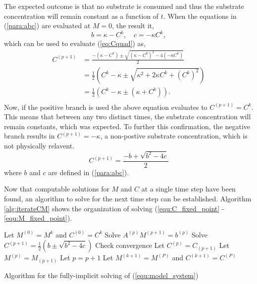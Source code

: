 The expected outcome is that no substrate is consumed and thus the substrate concentration will remain constant as a function of $t$. 
When the equations in (\ref{para:abc}) are evaluated at $M = 0$, the result it,
\begin{equation}
  b = \kappa - C^k, \quad c = -\kappa C^k,
\end{equation} 
which can be used to evaluate (\ref{eq:Cquad}) as,
\begin{equation} \begin{aligned}
  C^{(p+1)} &= \frac{- (\kappa - C^k) \pm \sqrt{(\kappa - C^k)^2 - 4 (-\kappa C^k)}}{2} \\
    &= \frac{1}{2} \left( C^k - \kappa \pm \sqrt{\kappa^2 + 2 \kappa C^k + \left(C^k \right) ^2}\right) \\
    &= \frac{1}{2} \left( C^k - \kappa \pm (\kappa+C^k) \right). \\
\end{aligned} \end{equation}
Now, if the positive branch is used the above equation evaluates to $C^{(p+1)} = C^k$. 
This means that between any two distinct times, the substrate concentration will remain constants, which was expected. 
To further this confirmation, the negative branch results in $C^{(p+1)} = -\kappa $, a non-postive substrate concentration, which is not physically relavent. 
\begin{equation}
  C^{(p+1)} = \frac{-b + \sqrt{b^2 - 4c}}{2}
\end{equation} 
where $b$ and $c$ are defined in (\ref{para:abc}).

Now that computable solutions for $M$ and $C$ at a single time step have been found, an algorithm to solve for the next time step can be established.
Algorithm \ref{alg:iterateCM} shows the organization of solving (\ref{equ:C_fixed_point} - \ref{equ:M_fixed_point}). 
\begin{algorithm}
  \Begin
  {
    Let $M^{(0)} = M^{k}$ and $C^{(0)} = C^{k}$\;
    {
        Solve $A^{(p)} M^{(p+1)} = b^{(p)}$\;
        Solve $C^{(p+1)} = \frac{1}{2} \left( b \pm \sqrt{b^2 - 4c} \right)$\;
        Check convergence\; 
        Let $C^{(p)} = C_{(p+1)}$\;
        Let $M^{(p)} = M_{(p+1)}$\;
        Let $p = p + 1 $\;
    }
    Let $M^{(k+1)} = M^{(P)}$ and $C^{(k+1)} = C^{(P)}$\;
  }
  \caption{Algorithm for the fully-implicit solving of (\ref{equ:model_system}) }
  \label{alg:iterateCM}
\end{algorithm}


